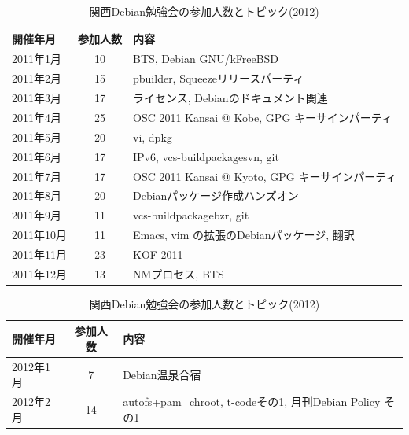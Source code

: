 \documentclass[mingoth,a4paper]{jsarticle}
\begin{document}
\pagebreak
\begin{table}
    \caption{関西Debian勉強会の参加人数とトピック(2011)}
    \begin{center}
      \begin{tabular}{|l|c|l|}
        \hline
        開催年月  & 参加人数 & 内容 \\
        \hline
        2011年1月 &10        & BTS, Debian GNU/kFreeBSD\\
        2011年2月 &15        & pbuilder, Squeezeリリースパーティ\\
        2011年3月 &17        & ライセンス, Debianのドキュメント関連\\
        2011年4月 &25        & OSC 2011 Kansai @ Kobe, GPG キーサインパーティ \\
        2011年5月 &20        & vi, dpkg \\
        2011年6月 &17        & IPv6, vcs-buildpackage{svn, git}\\
        2011年7月 &17        & OSC 2011 Kansai @ Kyoto, GPG キーサインパーティ\\
        2011年8月 &20        & Debianパッケージ作成ハンズオン\\
        2011年9月 &11        & vcs-buildpackage{bzr, git}\\
        2011年10月&11        & Emacs, vim の拡張のDebianパッケージ, 翻訳\\
        2011年11月&23        & KOF 2011\\
        2011年12月&13        & NMプロセス, BTS\\
        \hline
      \end{tabular}
    \end{center}
    \caption{関西Debian勉強会の参加人数とトピック(2012)}
    \label{tab:count2012kansai}
    \begin{center}
      \begin{tabular}{|l|c|l|}
        \hline
        開催年月  & 参加人数 & 内容 \\
        \hline
        2012年1月 & 7        & Debian温泉合宿 \\
        2012年2月 &14        & autofs+pam\_chroot, t-codeその1, 月刊Debian Policy その1 \\

\end{tabular}
\end{center}
\end{table}
\end{document}
